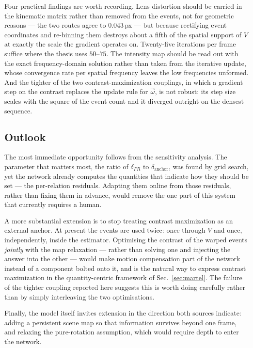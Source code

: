\documentclass[journal]{IEEEtran}
\newcommand{\Vmap}{V}
\newcommand{\wvec}{\vec{\omega}}
\begin{document}
Four practical findings are worth recording. Lens distortion should be carried
in the kinematic matrix rather than removed from the events, not for geometric
reasons --- the two routes agree to $0.043$\,px --- but because rectifying event
coordinates and re-binning them destroys about a fifth of the spatial support of
$\Vmap$ at exactly the scale the gradient operates on. Twenty-five iterations
per frame suffice where the thesis uses $50$--$75$. The intensity map should be
read out with the exact frequency-domain solution rather than taken from the
iterative update, whose convergence rate per spatial frequency leaves the low
frequencies unformed. And the tighter of the two contrast-maximization
couplings, in which a gradient step on the contrast replaces the update rule for
$\wvec$, is not robust: its step size scales with the square of the event count
and it diverged outright on the densest sequence.

\subsection*{Outlook}

The most immediate opportunity follows from the sensitivity analysis. The
parameter that matters most, the ratio of $\delta_{F\!R}$ to
$\delta_{\text{anchor}}$, was found by grid search, yet the network already computes the quantities that indicate
how they should be set --- the per-relation residuals. Adapting them online from
those residuals, rather than fixing them in advance, would remove the one part
of this system that currently requires a human.

A more substantial extension is to stop treating contrast maximization as an
external anchor. At present the events are used twice: once through $\Vmap$ and
once, independently, inside the estimator. Optimising the contrast of the warped
events \emph{jointly} with the map relaxation --- rather than solving one and
injecting the answer into the other --- would make motion compensation part of
the network instead of a component bolted onto it, and is the natural way to
express contrast maximization in the quantity-centric framework of
Sec.~\ref{sec:martel}. The failure of the tighter coupling reported here
suggests this is worth doing carefully rather than by simply interleaving the
two optimisations.

Finally, the model itself invites extension in the direction both sources
indicate: adding a persistent scene map so that information survives beyond one
frame, and relaxing the pure-rotation assumption, which would require depth to
enter the network.
\end{document}
